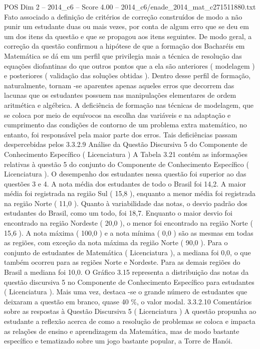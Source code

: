 \begin{textsample}{POS Dim 2 – 2014\_c6 – Score 4.00 – 2014\_c6/enade\_2014\_mat\_c271511880.txt}
Fato associado a definição de critérios de correção construídos de modo a não punir um estudante duas ou mais vezes, por conta de algum erro que se deu em um dos itens da questão e que se propagou aos itens seguintes.
De modo geral, a correção da questão confirmou a hipótese de que a formação dos Bacharéis em Matemática se dá em um perfil que privilegia mais a técnica de resolução das equações diofantinas do que outros pontos que a ela são anteriores ( modelagem ) e posteriores ( validação das soluções obtidas ).
Dentro desse perfil de formação, naturalmente, tornam -se aparentes apenas aqueles erros que decorrem das lacunas que os estudantes possuem nas manipulações elementares de ordem aritmética e algébrica.
A deficiência de formação nas técnicas de modelagem, que se coloca por meio de equívocos na escolha das variáveis e na adaptação e cumprimento das condições de contorno de um problema extra matemático, no entanto, foi responsável pela maior parte dos erros.
Tais deficiências passam despercebidas pelos 3.3.2.9 Análise da Questão Discursiva 5 do Componente de Conhecimento Específico ( Licenciatura ) A Tabela 3.21 contém as informações relativas à questão 5 do conjunto do Componente de Conhecimento Específico ( Licenciatura ).
O desempenho dos estudantes nessa questão foi superior ao das questões 3 e 4.
A nota média dos estudantes de todo o Brasil foi 14,2.
A maior média foi registrada na região Sul ( 15,8 ), enquanto a menor média foi registrada na região Norte ( 11,0 ).
Quanto à variabilidade das notas, o desvio padrão dos estudantes do Brasil, como um todo, foi 18,7.
Enquanto o maior desvio foi encontrado na região Nordeste ( 20,0 ), o menor foi encontrado na região Norte ( 15,6 ).
A nota máxima ( 100,0 ) e a nota mínima ( 0,0 ) são as mesmas em todas as regiões, com exceção da nota máxima da região Norte ( 90,0 ).
Para o conjunto de estudantes de Matemática ( Licenciatura ), a mediana foi 0,0, o que também ocorreu para as regiões Norte e Nordeste.
Para as demais regiões do Brasil a mediana foi 10,0.
O Gráfico 3.15 representa a distribuição das notas da questão discursiva 5 no Componente de Conhecimento Específico para estudantes ( Licenciatura ).
Mais uma vez, destaca -se o grande número de estudantes que deixaram a questão em branco, quase 40 \%, o valor modal. 3.3.2.10 Comentários sobre as respostas à Questão Discursiva 5 ( Licenciatura ) A questão propunha ao estudante a reflexão acerca de como a resolução de problemas se coloca e impacta as relações de ensino e aprendizagem da Matemática, mas de modo bastante específico e tematizado sobre um jogo bastante popular, a Torre de Hanói.

\end{textsample}
